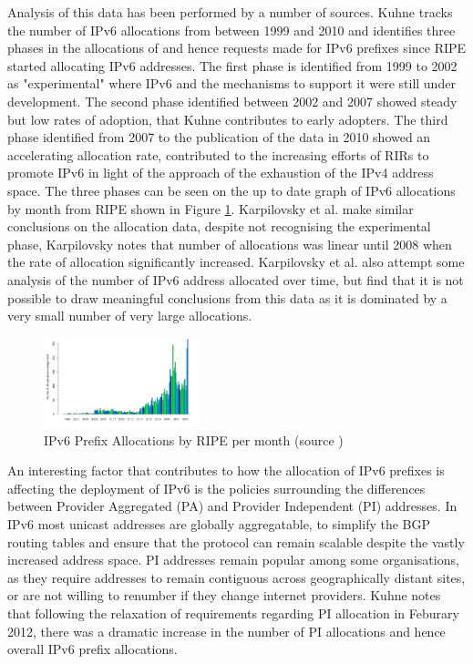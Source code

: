 Analysis of this data has been performed by a number of sources. Kuhne tracks
the number of IPv6 allocations from between 1999 and 2010 and identifies three
phases in the allocations of and hence requests made for IPv6 prefixes since
RIPE started allocating IPv6 addresses\cite{kuhne_interesting_2010}.
The first phase is identified from 1999 to
2002 as "experimental" where IPv6 and the mechanisms to support it were still
under development. The second phase identified between 2002 and 2007 showed
steady but low rates of adoption, that Kuhne contributes to early adopters. The
third phase identified from 2007 to the publication of the data in 2010 showed
an accelerating allocation rate, contributed to the increasing efforts of RIRs
to promote IPv6 in light of the approach of the exhaustion of the IPv4 address
space. The three phases can be seen on the up to date graph of IPv6 allocations
by month from RIPE shown in Figure \ref{fig:alloc-month}. Karpilovsky et al. make
similar conclusions on the allocation data, despite not recognising the
experimental phase, Karpilovsky notes that number of allocations was linear
until 2008 when the rate of allocation significantly increased\cite{karpilovsky_quantifying_2009}.
Karpilovsky et
al. also attempt some analysis of the number of IPv6 address allocated over
time, but find that it is not possible to draw meaningful conclusions from this
data as it is dominated by a very small number of very large allocations.

\begin{figure}[htb]
\centering
\includegraphics[width=0.4\textwidth]{img/v6-alloc-month.png}
\caption{IPv6 Prefix Allocations by RIPE per month (source \protect\cite{ripe_ncc_ipv6_2013})}
\label{fig:alloc-month}
\end{figure}

An interesting factor that contributes to how the allocation of IPv6 prefixes is
affecting the deployment of IPv6 is the policies surrounding the differences
between Provider Aggregated (PA) and Provider Independent (PI) addresses. In
IPv6 most unicast addresses are globally aggregatable, to simplify the BGP
routing tables and ensure that the protocol can remain scalable despite the
vastly increased address space. PI addresses remain popular among some
organisations, as they require addresses to remain contiguous across
geographically distant sites, or are not willing to renumber if they change
internet providers. Kuhne notes that following the relaxation of requirements
regarding PI allocation in Feburary 2012, there was a dramatic increase in the 
number of PI allocations and hence overall IPv6 prefix allocations\cite{mirjam_kuhne_update_2012}.


